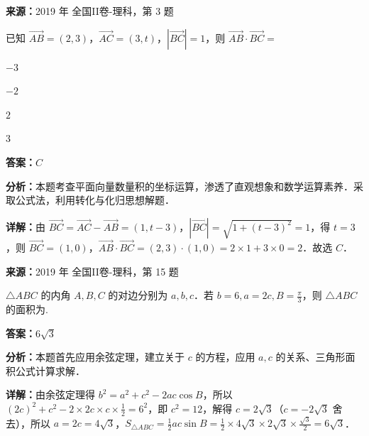 \begin{question}[points=5]
\textbf{来源：}2019 年 全国II卷-理科，第 3 题\par
已知 $\overrightarrow{AB}=(2,3)$，$\overrightarrow{AC}=(3,t)$，$|\overrightarrow{BC}|=1$，则 $\overrightarrow{AB}\cdot\overrightarrow{BC}=$
\begin{choices}
  \item $-3$
  \item $-2$
  \item $2$
  \item $3$
\end{choices}
\begin{solution}
\textbf{答案：}$C$

\textbf{分析：}本题考查平面向量数量积的坐标运算，渗透了直观想象和数学运算素养．采取公式法，利用转化与化归思想解题．

\textbf{详解：}由 $\overrightarrow{BC}=\overrightarrow{AC}-\overrightarrow{AB}=(1,t-3)$，$|\overrightarrow{BC}|=\sqrt{1+(t-3)^2}=1$，得 $t=3$，则 $\overrightarrow{BC}=(1,0)$，$\overrightarrow{AB}\cdot\overrightarrow{BC}=(2,3)\cdot(1,0)=2\times1+3\times0=2$．故选 $C$．
\end{solution}
\end{question}

\begin{question}[points=5]
\textbf{来源：}2019 年 全国II卷-理科，第 15 题\par
$\triangle ABC$ 的内角 $A,B,C$ 的对边分别为 $a,b,c$．若 $b=6,a=2c,B=\frac{\pi}{3}$，则 $\triangle ABC$ 的面积为.
\fillin[{$6\sqrt{3}$}]
\begin{solution}
\textbf{答案：}$6\sqrt{3}$

\textbf{分析：}本题首先应用余弦定理，建立关于 $c$ 的方程，应用 $a,c$ 的关系、三角形面积公式计算求解．

\textbf{详解：}由余弦定理得 $b^2=a^2+c^2-2ac\cos B$，所以 $(2c)^2+c^2-2\times 2c\times c\times\frac{1}{2}=6^2$，即 $c^2=12$，解得 $c=2\sqrt{3}$（$c=-2\sqrt{3}$ 舍去），所以 $a=2c=4\sqrt{3}$，$S_{\triangle ABC}=\frac{1}{2}ac\sin B=\frac{1}{2}\times 4\sqrt{3}\times 2\sqrt{3}\times\frac{\sqrt{3}}{2}=6\sqrt{3}$．
\end{solution}
\end{question}

